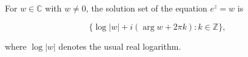 For $w \in \mathbb{C}$ with $w \neq 0$, the solution set of the equation $e^z = w$ is

$$\{ \log |w| + i(\arg w + 2\pi k) : k \in \mathbb{Z} \},$$

where $\log |w|$ denotes the usual real logarithm.

